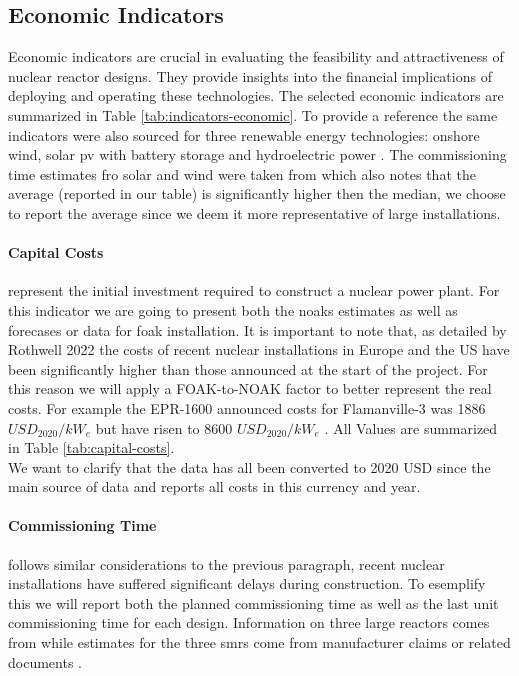 \subsection{Economic Indicators}
Economic indicators are crucial in evaluating the feasibility and attractiveness of nuclear reactor designs. They provide insights into the financial implications of deploying and operating these technologies. The selected economic indicators are summarized in Table \ref{tab:indicators-economic}. To provide a reference the same indicators were also sourced for three renewable energy technologies: onshore wind, solar pv with battery storage and hydroelectric power \cite{EIA_Capital_Costs_AEO2024}. The commissioning time estimates fro solar and wind were taken from \cite{GUMBER2024122563} which also notes that the average (reported in our table) is significantly higher then the median, we choose to report the average since we deem it more representative of large installations.

\paragraph{Capital Costs} represent the initial investment required to construct a nuclear power plant. For this indicator we are going to present both the \glspl{noak} estimates as well as forecases or data for \gls{foak} installation. It is important to note that, as detailed by Rothwell 2022 \cite{ROTHWELL2022112905} the costs of recent nuclear installations in Europe and the US have been significantly higher than those announced at the start of the project. For this reason we will apply a FOAK-to-NOAK factor to better represent the real costs. For example the EPR-1600 announced costs for Flamanville-3 was 1886 $USD_{2020}/kW_e$ but have risen to 8600 $USD_{2020}/kW_e$ \cite{NEA2020}. All Values are summarized in Table \ref{tab:capital-costs}. \\

We want to clarify that the data has all been converted to 2020 USD since the main source of data \cite{STEIGERWALD2023128204} and \cite{NEA2020} reports all costs in this currency and year. \\

\paragraph{Commissioning Time} follows similar considerations to the previous paragraph, recent nuclear installations have suffered significant delays during construction. To esemplify this we will report both the planned commissioning time as well as the last unit commissioning time for each design. Information on three large reactors comes from \cite{nea2020unlocking} while estimates for the three \glspl{smr} come from manufacturer claims or related documents \cite{GEVernova_Nuclear_2025, RollsRoyce_SMR_Approach_2025, IEEFA_UAMPS_Talking_Points_2023}.

